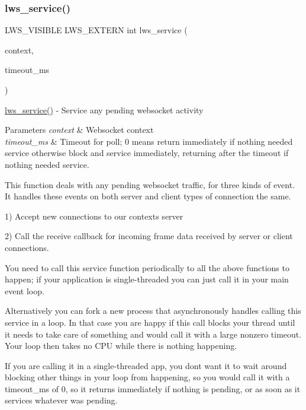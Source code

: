 \subsubsection{\texorpdfstring{lws\+\_\+service()}{lws\_service()}}
{\footnotesize\ttfamily L\+W\+S\+\_\+\+V\+I\+S\+I\+B\+LE L\+W\+S\+\_\+\+E\+X\+T\+E\+RN int lws\+\_\+service (\begin{DoxyParamCaption}\item[{struct \hyperlink{structlws__context}{lws\+\_\+context} $\ast$}]{context,  }\item[{int}]{timeout\+\_\+ms }\end{DoxyParamCaption})}

\hyperlink{group__service_gaf95bd0c663d6516a0c80047d9b1167a8}{lws\+\_\+service()} -\/ Service any pending websocket activity 
\begin{DoxyParams}{Parameters}
{\em context} & Websocket context \\
\hline
{\em timeout\+\_\+ms} & Timeout for poll; 0 means return immediately if nothing needed service otherwise block and service immediately, returning after the timeout if nothing needed service.\\
\hline
\end{DoxyParams}
This function deals with any pending websocket traffic, for three kinds of event. It handles these events on both server and client types of connection the same.

1) Accept new connections to our context\textquotesingle{}s server

2) Call the receive callback for incoming frame data received by server or client connections.

You need to call this service function periodically to all the above functions to happen; if your application is single-\/threaded you can just call it in your main event loop.

Alternatively you can fork a new process that asynchronously handles calling this service in a loop. In that case you are happy if this call blocks your thread until it needs to take care of something and would call it with a large nonzero timeout. Your loop then takes no C\+PU while there is nothing happening.

If you are calling it in a single-\/threaded app, you don\textquotesingle{}t want it to wait around blocking other things in your loop from happening, so you would call it with a timeout\+\_\+ms of 0, so it returns immediately if nothing is pending, or as soon as it services whatever was pending. \mbox{\label{group__service_ga4fd9d714434ca499e2b3f7dbba86f241}} 
